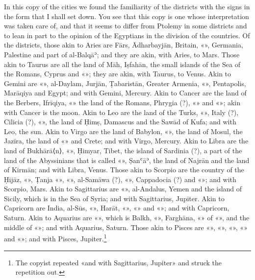 \documentclass[11pt]{article}
\newcommand{\Fol}[1]{\marginpar{\footnotesize\color{gray}f.\,#1}}
\begin{document}
\par \Fol{26v}In this copy of the cities we found the familiarity of the districts with the signs in the form that I shall set down. You see that this copy is one whose interpretation was taken care of, and that it seems to differ from Ptolemy in some districts and to lean in part to the opinion of the Egyptians in the division of the countries. Of the districts, those akin to Aries are Fārs, Ādharbayjān, Britain, «», Germania, Palestine and part of al-Balqāʾ; and they are akin, with Aries, to Mars. Those akin to Taurus are all the land of Māh, Iṣfahān, the small islands of the Sea of the Romans, Cyprus and «»; they are akin, with Taurus, to Venus. Akin to Gemini are «», al-Daylam, Jurjān, Ṭabaristān, Greater Armenia, «», Pentapolis, Marāqiya and Egypt; and with Gemini, Mercury. Akin to Cancer are the land of the Berbers, Ifrīqiya, «» the land of the Romans, Phrygia (?), «» and «»; akin with Cancer is the moon. Akin to Leo are the land of the Turks, «», Italy (?), Cilicia (?), «», the land of Ḥimṣ, Damascus and the Sawād of Kufa; and with Leo, the sun. Akin to Virgo are the land of Babylon, «», the land of Mosul, the Jazīra, the land of «» and Crete; and with Virgo, Mercury. Akin to Libra are the land of Bukhārā{\mdseries ⟨}n{\mdseries ⟩}, «», Ḥimyar, Tibet, the island of Sardinia (?), a part of the land of the Abyssinians that is called «», Ṣanʿāʾ, the land of Najrān and the land of Kirmān; and with Libra, Venus. Those akin to Scorpio are the country of the Ḥijāz, «», Ṭanja «», «», al-Samāwa (?), «», Cappadocia (?) and «»; and with Scorpio, Mars. Akin to Sagittarius are «», al-Andalus, Yemen and the island of Sicily, which is in the Sea of Syria; and with Sagittarius, Jupiter. Akin to Capricorn are India, al-Sūs, «», Harāt, «», «» and «»; and with Capricorn, Saturn. Akin to Aquarius are «», which is Balkh, «», Farghāna, «» of «», and the middle of «»; and with Aquarius, Saturn. Those akin to Pisces are «», «», «», «» and «»; and with Pisces, Jupiter.\footnote{The copyist repeated «and with Sagittarius, Jupiter» and struck the repetition out.}\par
\end{document}
